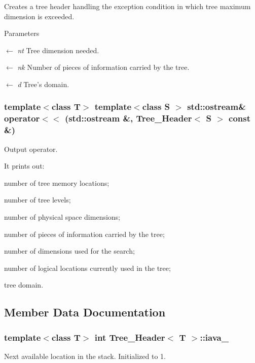 Creates a tree header handling the exception condition in which tree maximum dimension is exceeded. 
\begin{DoxyParams}{Parameters}
\item[\mbox{$\leftarrow$} {\em nt}]Tree dimension needed. \item[\mbox{$\leftarrow$} {\em nk}]Number of pieces of information carried by the tree. \item[\mbox{$\leftarrow$} {\em d}]Tree's domain. \end{DoxyParams}
\hypertarget{classTree__Header_a444b2368a05d862bc11bf418e11c5e51}{
\subsubsection[{operator$<$$<$}]{\setlength{\rightskip}{0pt plus 5cm}template$<$class T$>$ template$<$class S $>$ std::ostream\& operator$<$$<$ (std::ostream \&, \/  {\bf Tree\_\-Header}$<$ S $>$ const \&)}}
\label{classTree__Header_a444b2368a05d862bc11bf418e11c5e51}
Output operator.

It prints out:
\begin{DoxyItemize}
\item number of tree memory locations;
\item number of tree levels;
\item number of physical space dimensions;
\item number of pieces of information carried by the tree;
\item number of dimensions used for the search;
\item number of logical locations currently used in the tree;
\item tree domain. 
\end{DoxyItemize}

\subsection{Member Data Documentation}
\hypertarget{classTree__Header_a106cee8ef2a9bc2b15a2ea97bc11d72b}{
\subsubsection[{iava\_\-}]{\setlength{\rightskip}{0pt plus 5cm}template$<$class T$>$ int {\bf Tree\_\-Header}$<$ T $>$::{\bf iava\_\-}}}
\label{classTree__Header_a106cee8ef2a9bc2b15a2ea97bc11d72b}
Next available location in the stack. Initialized to 1.

